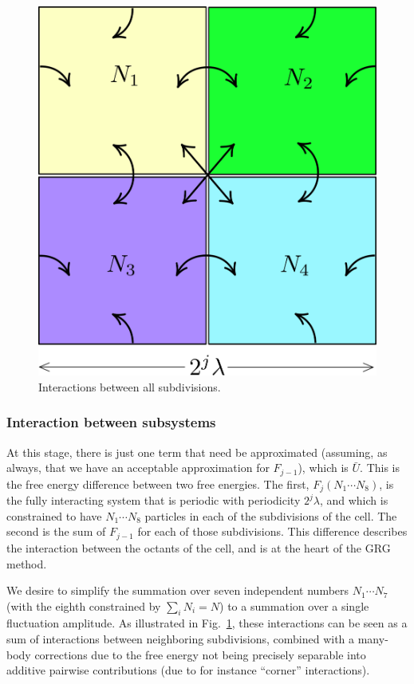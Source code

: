 \documentclass[letterpaper,twocolumn,amsmath,amssymb,pre,aps,10pt]{revtex4-1}
\begin{document}
\begin{figure}
  \centering
  \includegraphics[width=0.8\columnwidth]{figs/interactions}
  \caption{Interactions between all subdivisions.}\label{fig:interactions}
\end{figure}

\subsubsection{Interaction between subsystems}
At this stage, there is just one term that need be approximated
(assuming, as always, that we have an acceptable approximation for
$F_{j-1}$), which is $\bar{U}$.  This is the free energy difference
between two free energies.  The first, $F_j(N_1\cdots N_8)$, is the
fully interacting system that is periodic with periodicity
$2^j\lambda$, and which is constrained to have $N_1\cdots N_8$
particles in each of the subdivisions of the cell.  The second is the
sum of $F_{j-1}$ for each of those subdivisions.  This difference
describes the interaction between the octants of the cell, and is at
the heart of the GRG method.

We desire to simplify the summation over seven independent numbers
$N_1\cdots N_7$ (with the eighth constrained by $\sum_i N_i = N$) to a
summation over a single fluctuation amplitude.  As illustrated in
Fig.~\ref{fig:interactions}, these interactions can be seen as a sum
of interactions between neighboring subdivisions, combined with a
many-body corrections due to the free energy not being precisely
separable into additive pairwise contributions (due to for instance
``corner'' interactions).
\end{document}
